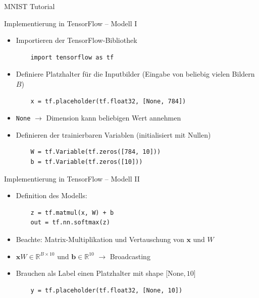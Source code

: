 \documentclass[utf8, smaller, c]{beamer}
\renewcommand{\tt}[1]{{\texttt{#1}}}
\begin{document}
\begin{frame}{MNIST Tutorial}
	\begin{block}{Implementierung in TensorFlow -- Modell I}
		\begin{itemize}
			\item Importieren der TensorFlow-Bibliothek
			\begin{lstlisting}
	import tensorflow as tf
			\end{lstlisting}
			\item Definiere Platzhalter für die Inputbilder (Eingabe von beliebig vielen Bildern $B$)
			\begin{lstlisting}
	x = tf.placeholder(tf.float32, [None, 784])
			\end{lstlisting}
			\item \tt{None} $\rightarrow$ Dimension kann beliebigen Wert annehmen
			\item Definieren der trainierbaren Variablen (initialisiert mit Nullen)
			\begin{lstlisting}
	W = tf.Variable(tf.zeros([784, 10]))
	b = tf.Variable(tf.zeros([10]))
			\end{lstlisting}
		\end{itemize}
	\end{block}
	
	\framebreak
	
	\begin{block}{Implementierung in TensorFlow -- Modell II}
		\begin{itemize}
			\item Definition des Modells:
			\begin{lstlisting}
	z = tf.matmul(x, W) + b
	out = tf.nn.softmax(z)
			\end{lstlisting}
			\item Beachte: Matrix-Multiplikation und Vertauschung von $\mathbf{x}$ und $W$
			\item $\mathbf{x}W \in \mathbb{R}^{B \times 10}$ und $\mathbf{b}\in\mathbb{R}^{10}$ $\rightarrow$ Broadcasting
			\item Brauchen als Label einen Platzhalter mit shape $[$None$, 10]$ 
			\begin{lstlisting}
	y = tf.placeholder(tf.float32, [None, 10])
			\end{lstlisting}
		\end{itemize}
	\end{block}
	
	\framebreak
	

\end{frame}
\end{document}
